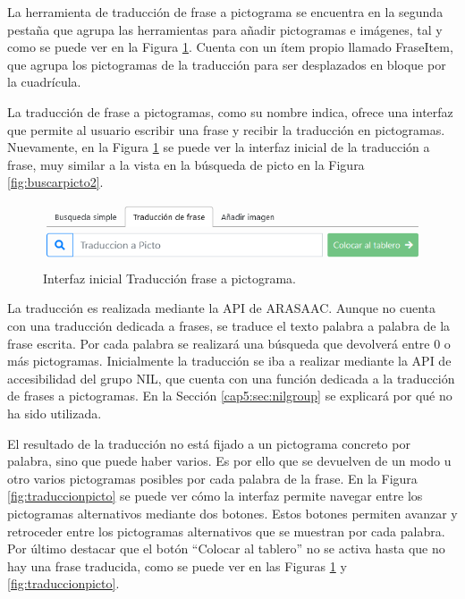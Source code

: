 La herramienta de traducción de frase a pictograma se encuentra en la segunda pestaña que agrupa las herramientas para añadir pictogramas e imágenes, tal y como se puede ver en la Figura \ref{fig:traducirfraseinicial}. Cuenta con un ítem propio llamado FraseItem, que agrupa los pictogramas de la traducción para ser desplazados en bloque por la cuadrícula.

La traducción de frase a pictogramas, como su nombre indica, ofrece una interfaz que permite al usuario escribir una frase y recibir la traducción en pictogramas. Nuevamente, en la Figura \ref{fig:traducirfraseinicial} se puede ver la interfaz inicial de la traducción a frase, muy similar a la vista en la búsqueda de picto en la Figura \ref{fig:buscarpicto2}. 

\begin{figure}[h!]
	\centering
	\includegraphics[width=0.7\linewidth]{Imagenes/Bitmap/traducirFraseInicial}
	\caption{Interfaz inicial Traducción frase a pictograma.}
	\label{fig:traducirfraseinicial}
\end{figure}

 
La traducción es realizada mediante la API de ARASAAC. Aunque no cuenta con una traducción dedicada a frases, se traduce el texto palabra a palabra de la frase escrita. Por cada palabra se realizará una búsqueda que devolverá entre 0 o más pictogramas. Inicialmente la traducción se iba a realizar mediante la API de accesibilidad del grupo NIL, que cuenta con una función dedicada a la traducción de frases a pictogramas. En la Sección \ref{cap5:sec:nilgroup} se explicará por qué no ha sido utilizada. 


El resultado de la traducción no está fijado a un pictograma concreto por palabra, sino que puede haber varios. Es por ello que se devuelven de un modo u otro varios pictogramas posibles por cada palabra de la frase.  En la Figura \ref{fig:traduccionpicto} se puede ver cómo la interfaz permite navegar entre los pictogramas alternativos mediante dos botones.
Estos botones permiten avanzar y retroceder entre los pictogramas alternativos que se muestran por cada palabra. Por último destacar que el botón “Colocar al tablero” no se activa hasta que no hay una frase traducida, como se puede ver en las Figuras \ref{fig:traducirfraseinicial} y \ref{fig:traduccionpicto}. 

